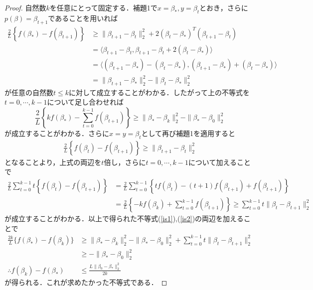 \documentclass{jsarticle}
\theoremstyle{definition}
\theoremstyle{mystyle} %
\begin{document}
\begin{proof}
自然数$k$を任意にとって固定する．補題1で$x=\beta_{\ast},y=\beta_t$とおき，さらに$p(\beta)=\beta_{t+1}$であることを用いれば
\begin{align*}
\frac{2}{L}\left\{f(\beta_{\ast})-f(\beta_{t+1})\right\}&\geq \|\beta_{t+1}-\beta_t\|_2^2+2(\beta_t-\beta_{\ast})^T(\beta_{t+1}-\beta_t)\\
&=\langle \beta_{t+1}-\beta_t,\beta_{t+1}-\beta_t+2(\beta_t-\beta_{\ast})  \rangle\\
&=\langle (\beta_{t+1}-\beta_{\ast})-(\beta_t-\beta_{\ast}),(\beta_{t+1}-\beta_{\ast})+(\beta_t-\beta_{\ast}) \rangle\\
&=\|\beta_{t+1}-\beta_{\ast}\|_2^2-\|\beta_t-\beta_{\ast}\|_2^2
\end{align*}
が任意の自然数$t\leq k$に対して成立することがわかる．したがって上の不等式を$t=0,\cdots,k-1$について足し合わせれば
\begin{equation}
\label{is1}
\frac{2}{L}\left\{kf(\beta_{\ast})-\sum_{t=0}^{k-1}f(\beta_{t+1})\right\}\geq \|\beta_{\ast}-\beta_k\|_2^2-\|\beta_{\ast}-\beta_0\|_2^2
\end{equation}
が成立することがわかる．さらに$x=y=\beta_t$として再び補題1を適用すると
\begin{align*}
\frac{2}{L}\left\{f(\beta_{t})-f(\beta_{t+1})\right\}\geq \|\beta_{t+1}-\beta_t\|_2^2
\end{align*}
となることより，上式の両辺を$t$倍し，さらに$t=0,\cdots ,k-1$について加えることで
\begin{align}
\frac{2}{L}\sum_{t=0}^{k-1}t\left\{f(\beta_t)-f(\beta_{t+1})\right\}&=\frac{2}{L}\sum_{t=0}^{k-1}\left\{tf(\beta_t)-(t+1)f(\beta_{t+1})+f(\beta_{t+1})\right\}\\
\label{is2}
&=\frac{2}{L}\left\{-kf(\beta_k)+\sum_{t=0}^{k-1}f(\beta_{t+1})\right\}\geq \sum_{t=0}^{k-1}t\|\beta_t-\beta_{t+1}\|_2^2
\end{align}
が成立することがわかる．以上で得られた不等式(\ref{is1}),(\ref{is2})の両辺を加えることで
\begin{align*}
\frac{2k}{L}\{f(\beta_{\ast})-f(\beta_k)\}&\geq \|\beta_{\ast}-\beta_k\|_2^2-\|\beta_{\ast}-\beta_0\|_2^2+\sum_{t=0}^{k-1}t\|\beta_t-\beta_{t+1}\|_2^2\\
&\geq -\|\beta_{\ast}-\beta_0\|_2^2\\
\therefore f(\beta_k)-f(\beta_{\ast})&\leq \frac{L\|\beta_0-\beta_{\ast}\|_2^2}{2k}
\end{align*}
が得られる．これが求めたかった不等式である．
\end{proof}
\end{document}
